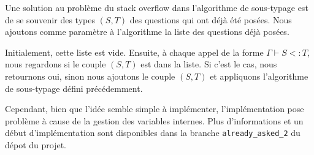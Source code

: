 Une solution au problème du stack overflow dans l'algorithme de sous-typage est
de se souvenir des types $(S, T)$ des questions qui ont déjà été posées. Nous
ajoutons comme paramètre à l'algorithme la liste des questions déjà posées.

Initialement, cette liste est vide. Ensuite, à chaque appel de la forme $\Gamma
\vdash S <: T$, nous regardons si le couple $(S, T)$ est dans la liste. Si c'est
le cas, nous retournons oui, sinon nous ajoutons le couple $(S, T)$ et
appliquons l'algorithme de sous-typage défini précédemment.

Cependant, bien que l'idée semble simple à implémenter, l'implémentation pose
problème à cause de la gestion des variables internes.
Plus d'informations et un début d'implémentation sont disponibles dans la
branche \verb|already_asked_2| du dépot du projet.

